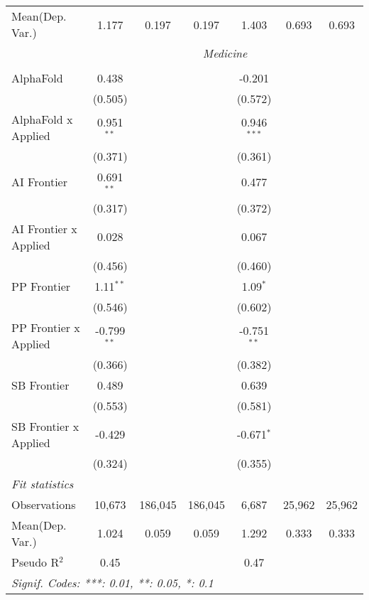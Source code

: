 \begin{tabular}{lcccccc}
Mean(Dep. Var.) & 1.177 & 0.197 & 0.197 & 1.403 & 0.693 & 0.693 \\
 & \multicolumn{6}{c}{\textit{Medicine}} \\ \\
   AlphaFold             & 0.438         &         &         & -0.201        &        &   \\   
                         & (0.505)       &         &         & (0.572)       &        &   \\   
   AlphaFold x Applied   & 0.951$^{**}$  &         &         & 0.946$^{***}$ &        &   \\   
                         & (0.371)       &         &         & (0.361)       &        &   \\   
   AI Frontier           & 0.691$^{**}$  &         &         & 0.477         &        &   \\   
                         & (0.317)       &         &         & (0.372)       &        &   \\   
   AI Frontier x Applied & 0.028         &         &         & 0.067         &        &   \\   
                         & (0.456)       &         &         & (0.460)       &        &   \\   
   PP Frontier           & 1.11$^{**}$   &         &         & 1.09$^{*}$    &        &   \\   
                         & (0.546)       &         &         & (0.602)       &        &   \\   
   PP Frontier x Applied & -0.799$^{**}$ &         &         & -0.751$^{**}$ &        &   \\   
                         & (0.366)       &         &         & (0.382)       &        &   \\   
   SB Frontier           & 0.489         &         &         & 0.639         &        &   \\   
                         & (0.553)       &         &         & (0.581)       &        &   \\   
   SB Frontier x Applied & -0.429        &         &         & -0.671$^{*}$  &        &   \\   
                         & (0.324)       &         &         & (0.355)       &        &   \\   
   \midrule
   \emph{Fit statistics}\\
   Observations          & 10,673        & 186,045 & 186,045 & 6,687         & 25,962 & 25,962\\  
Mean(Dep. Var.) & 1.024 & 0.059 & 0.059 & 1.292 & 0.333 & 0.333 \\
   Pseudo R$^2$          & 0.45          &         &         & 0.47          &        & \\  
   \midrule \midrule
   \multicolumn{7}{l}{\emph{Signif. Codes: ***: 0.01, **: 0.05, *: 0.1}}\\
\end{tabular}
\par\endgroup
